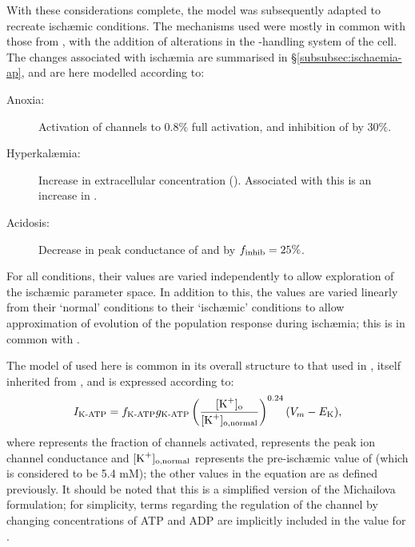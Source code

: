 \documentclass[../thesis-main.tex]{subfiles}
\begin{document}
With these considerations complete, the model was subsequently adapted to recreate isch\ae{}mic conditions. The mechanisms used were mostly in common with those from \citet{Rodriguez2006}, with the addition of alterations in the \na{}-handling system of the cell. The changes associated with isch\ae{}mia are summarised in \S\ref{subsubsec:ischaemia-ap}, and are here modelled according to:
\begin{description}
 \item[Anoxia:] Activation of \ikatp{} channels to $0.8\%$ full activation, and inhibition of \inak{} by $30\%$.
 \item[Hyperkal\ae{}mia:] Increase in extracellular \K{} concentration (\ko{}). Associated with this is an increase in \nai{}.
 \item[Acidosis:] Decrease in peak conductance of \ina{} and \ica{} by $f_\textnormal{inhib}=25\%$.
\end{description}
For all conditions, their values are varied independently to allow exploration of the isch\ae{}mic parameter space. In addition to this, the values are varied linearly from their `normal' conditions to their `isch\ae{}mic' conditions to allow approximation of evolution of the population response during isch\ae{}mia; this is in common with \citet{Rodriguez2004}.

The model of \ikatp{} used here is common in its overall structure to that used in \citet{Michailova2007}, itself inherited from \citet{Michailova2005}, and is expressed according to:
\begin{equation}
 I_\textnormal{K-ATP} = f_\textnormal{K-ATP}g_\textnormal{K-ATP}\left(\frac{[\textnormal{K}^+]_\textnormal{o}}{[\textnormal{K}^+]_\textnormal{o,normal}}\right)^{0.24}(V_m-E_\textnormal{K}),
\end{equation}
where \fkatp{} represents the fraction of \ikatp{} channels activated, \gkatp{} represents the peak ion channel conductance and $[\textnormal{K}^+]_\textnormal{o,normal}$ represents the pre-isch\ae{}mic value of \ko{} (which is considered to be 5.4 mM); the other values in the equation are as defined previously. It should be noted that this is a simplified version of the Michailova formulation; for simplicity, terms regarding the regulation of the channel by changing concentrations of ATP and ADP are implicitly included in the value for \gkatp{}.
\end{document}
